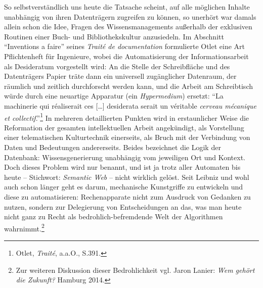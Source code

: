 So selbstverständlich uns heute die Tatsache scheint, auf alle möglichen
Inhalte unabhängig von ihren Datenträgern zugreifen zu können, so
unerhört war damals allein schon die Idee, Fragen des Wissensmanagements
außerhalb der exklusiven Routinen einer Buch- und Bibliothekskultur
anzusiedeln. Im Abschnitt \enquote{Inventions a faire} seines
\emph{Traité de documentation} formulierte Otlet eine Art Pflichtenheft
für Ingenieure, wobei die Automatisierung der Informationsarbeit als
Desideratum vorgestellt wird: An die Stelle der Schreibfläche und des
Datenträgers Papier träte dann ein universell zugänglicher Datenraum,
der räumlich und zeitlich durchforscht werden kann, und die Arbeit am
Schreibtisch würde durch eine neuartige Apparatur (ein
\emph{Hypermedium}) ersetzt: \enquote{La machinerie qui réaliserait ces
{[}\ldots{}{]} desiderata serait un véritable \emph{cerveau mécanique et
collectif}.}\footnote{Otlet, \emph{Traité}, a.a.O., S.391.} In mehreren
detaillierten Punkten wird in erstaunlicher Weise die Reformation der
gesamten intellektuellen Arbeit angekündigt, als Vorstellung einer
telematischen Kulturtechnik einerseits, als Bruch mit der Verbindung von
Daten und Bedeutungen andererseits. Beides bezeichnet die Logik der
Datenbank: Wissensgenerierung unabhängig vom jeweiligen Ort und Kontext.
Doch dieses Problem wird nur benannt, und ist ja trotz aller Automaten
bis heute -- Stichwort: \emph{Semantic Web} -- nicht wirklich gelöst.
Seit Leibniz und wohl auch schon länger geht es darum, mechanische
Kunstgriffe zu entwickeln und diese zu automatisieren: Rechenapparate
nicht zum Ausdruck von Gedanken zu nutzen, sondern zur Delegierung von
Entscheidungen an das, was man heute nicht ganz zu Recht als
bedrohlich-befremdende Welt der Algorithmen wahrnimmt.\footnote{Zur
  weiteren Diskussion dieser Bedrohlichkeit vgl. Jaron Lanier: \emph{Wem
  gehört die Zukunft?} Hamburg 2014.}
